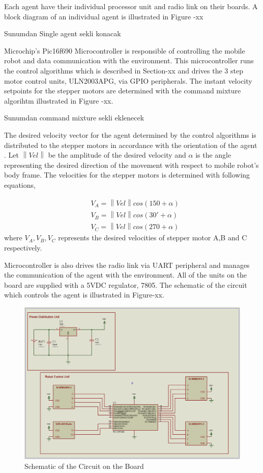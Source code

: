 \documentclass[twoside]{article}
\newcommand{\norm}[1]{\left\lVert#1\right\rVert}
\begin{document}
		Each agent have their individual processor unit and radio link on their boards. A block diagram of an individual agent is illustrated in Figure -xx 
		
		Sunumdan Single agent sekli konacak
		
		Microchip's Pic16f690 Microcontroller is responsible of controlling the mobile robot and data communication with the environment. This microcontroller runs the control algorithms which is described in Section-xx and drives the 3 step motor control units, ULN2003APG, via GPIO peripherals. The instant velocity setpoints for the stepper motors  are determined with the command mixture algorihtm illustrated in Figure -xx.
		
		Sunumdan command mixture sekli eklenecek
		
		The desired velocity vector for the agent determined by the control algorithms is  distributed to the stepper motors in accordance with the orientation of the agent . Let $\norm{Vel}$ be the amplitude of the desired velocity and $\alpha$ is the angle representing the desired direction of the movement with respect to mobile robot's body frame.  The velocities for the stepper motors is determined with following equations,
		
		\begin{align*}
		& V_A = \norm{Vel} cos(150+\alpha) \\
		& V_B = \norm{Vel} cos(30 ' +\alpha) \\
		& V_C = \norm{Vel} cos(270+\alpha) 
		\end{align*}  
	where $V_A, V_B, V_C$ represents the desired velocities of  stepper motor A,B and C respectively.
		
		
		Microcontroller is also drives the radio link via UART peripheral and manages the communication of the agent with the environment. All of the units on the board are supplied with a 5VDC regulator, 7805. The schematic of the circuit which controls the agent is illustrated in Figure-xx.
		
					\begin{figure}[H]
						\caption{Schematic of the Circuit on the Board}
						\centerline{\includegraphics[scale = 0.40]{sematik}}
					\end{figure} 
\end{document}
